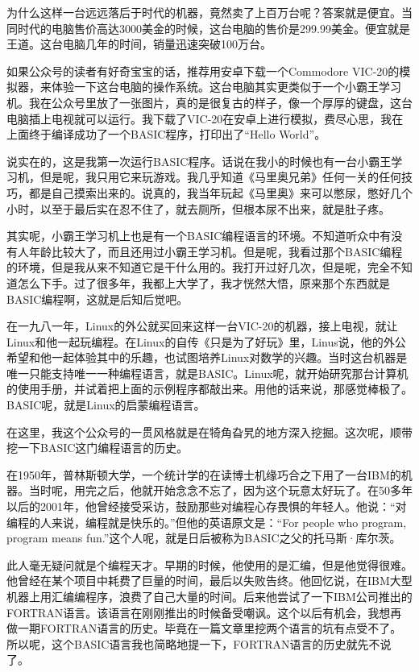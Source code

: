 \documentclass[
  letterpaper,
  DIV=11,
  numbers=noendperiod]{scrreprt}
\begin{document}
为什么这样一台远远落后于时代的机器，竟然卖了上百万台呢？答案就是便宜。当同时代的电脑售价高达3000美金的时候，这台电脑的售价是299.99美金。便宜就是王道。这台电脑几年的时间，销量迅速突破100万台。

如果公众号的读者有好奇宝宝的话，推荐用安卓下载一个Commodore
VIC-20的模拟器，来体验一下这台电脑的操作系统。这台电脑其实更类似于一个小霸王学习机。我在公众号里放了一张图片，真的是很复古的样子，像一个厚厚的键盘，这台电脑插上电视就可以运行。我下载了VIC-20在安卓上进行模拟，费尽心思，我在上面终于编译成功了一个BASIC程序，打印出了``Hello
World''。

说实在的，这是我第一次运行BASIC程序。话说在我小的时候也有一台小霸王学习机，但是呢，我只用它来玩游戏。我几乎知道《马里奥兄弟》任何一关的任何技巧，都是自己摸索出来的。说真的，我当年玩起《马里奥》来可以憋尿，憋好几个小时，以至于最后实在忍不住了，就去厕所，但根本尿不出来，就是肚子疼。

其实呢，小霸王学习机上也是有一个BASIC编程语言的环境。不知道听众中有没有人年龄比较大了，而且还用过小霸王学习机。但是呢，我看过那个BASIC编程的环境，但是我从来不知道它是干什么用的。我打开过好几次，但是呢，完全不知道怎么下手。过了很多年，我都上大学了，我才恍然大悟，原来那个东西就是BASIC编程啊，这就是后知后觉吧。

在一九八一年，Linux的外公就买回来这样一台VIC-20的机器，接上电视，就让Linux和他一起玩编程。在Linux的自传《只是为了好玩》里，Linus说，他的外公希望和他一起体验其中的乐趣，也试图培养Linux对数学的兴趣。当时这台机器是唯一只能支持唯一一种编程语言，就是BASIC。Linux呢，就开始研究那台计算机的使用手册，并试着把上面的示例程序都敲出来。用他的话来说，那感觉棒极了。BASIC呢，就是Linux的启蒙编程语言。

在这里，我这个公众号的一贯风格就是在犄角旮旯的地方深入挖掘。这次呢，顺带挖一下BASIC这门编程语言的历史。

在1950年，普林斯顿大学，一个统计学的在读博士机缘巧合之下用了一台IBM的机器。当时呢，用完之后，他就开始念念不忘了，因为这个玩意太好玩了。在50多年以后的2001年，他曾经接受采访，鼓励那些对编程心存畏惧的年轻人。他说：``对编程的人来说，编程就是快乐的。''但他的英语原文是：``For
people who program, program means
fun.''这个人呢，就是日后被称为BASIC之父的托马斯·库尔茨。

此人毫无疑问就是个编程天才。早期的时候，他使用的是汇编，但是他觉得很难。他曾经在某个项目中耗费了巨量的时间，最后以失败告终。他回忆说，在IBM大型机器上用汇编编程序，浪费了自己大量的时间。后来他尝试了一下IBM公司推出的FORTRAN语言。该语言在刚刚推出的时候备受嘲讽。这个以后有机会，我想再做一期FORTRAN语言的历史。毕竟在一篇文章里挖两个语言的坑有点受不了。所以呢，这个BASIC语言我也简略地提一下，FORTRAN语言的历史就先不说了。
\end{document}
